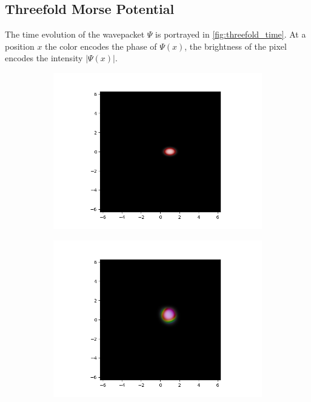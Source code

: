 \documentclass[11pt, a4paper, oneside]{article}
\begin{document}
\begin{appendices}
\subsection{Threefold Morse Potential}
The time evolution of the wavepacket $\Psi$ is portrayed in \cref{fig:threefold_time}. At a position $x$ the color encodes the phase of $\Psi(x)$, the brightness of the pixel encodes the intensity $\lvert \Psi(x) \rvert$.
\begin{figure}[h]
  \begin{subfigure}[b]{0.5 \textwidth}
    \includegraphics[width = \textwidth]{graphics/threefold_morse/wavefunction_contour_block_0_level_0_timestep_0000000.PNG}
  \end{subfigure}
  \hfill
  \begin{subfigure}[b]{0.5 \textwidth}
    \includegraphics[width = \textwidth]{graphics/threefold_morse/wavefunction_contour_block_0_level_0_timestep_0000100.PNG}

\end{subfigure}
\end{figure}
\end{appendices}
\end{document}
